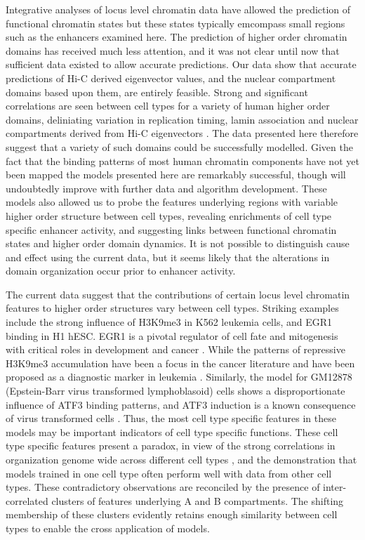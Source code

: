 \documentclass[a4paper,10pt,oneside]{book}
\begin{document}
Integrative analyses of locus level chromatin data have allowed the
prediction of functional chromatin states \cite{Ernst2012, Ram2011,
  Dunham2012, Hoffman2013} but these states typically emcompass small
regions such as the enhancers examined here. The prediction of higher
order chromatin domains has received much less attention, and it was
not clear until now that sufficient data existed to allow accurate
predictions. Our data show that accurate predictions of Hi-C derived
eigenvector values, and the nuclear compartment domains based upon
them, are entirely feasible. Strong and significant correlations are
seen between cell types for a variety of human higher order domains,
deliniating variation in replication timing, lamin association and
nuclear compartments derived from Hi-C eigenvectors
\cite{Chambers2013}. The data presented here therefore suggest that a
variety of such domains could be successfully modelled. Given the fact
that the binding patterns of most human chromatin components have not
yet been mapped the models presented here are remarkably successful,
though will undoubtedly improve with further data and algorithm
development. These models also allowed us to probe the features
underlying regions with variable higher order structure between cell
types, revealing enrichments of cell type specific enhancer activity,
and suggesting links between functional chromatin states and higher
order domain dynamics. It is not possible to distinguish cause and
effect using the current data, but it seems likely that the
alterations in domain organization occur prior to enhancer activity.

The current data suggest that the contributions of certain locus level
chromatin features to higher order structures vary between cell
types. Striking examples include the strong influence of H3K9me3 in
K562 leukemia cells, and EGR1 binding in H1 hESC. EGR1 is a pivotal
regulator of cell fate and mitogenesis with critical roles in
development and cancer \cite{Zwang2012}. While the patterns of
repressive H3K9me3 accumulation have been a focus in the cancer
literature and have been proposed as a diagnostic marker in leukemia
\cite{Muller-Tidow2010}. Similarly, the model for GM12878
(Epstein-Barr virus transformed lymphoblasoid) cells shows a
disproportionate influence of ATF3 binding patterns, and ATF3
induction is a known consequence of virus transformed cells
\cite{Hagmeyer1996}. Thus, the most cell type specific features in
these models may be important indicators of cell type specific
functions. These cell type specific features present a paradox, in
view of the strong correlations in organization genome wide across
different cell types \cite{Chambers2013, Dixon2012}, and the
demonstration that models trained in one cell type often perform well
with data from other cell types. These contradictory observations are
reconciled by the presence of inter-correlated clusters of features
underlying A and B compartments. The shifting membership of these
clusters evidently retains enough similarity between cell types to
enable the cross application of models.
\end{document}

